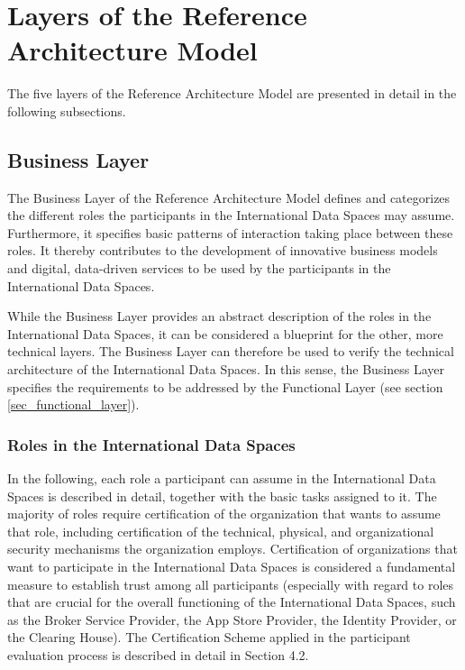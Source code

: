 \section{Layers of the Reference Architecture Model}\label{sec:layers}
The five layers of the Reference Architecture Model are presented in detail in the following subsections.

\subsection{Business Layer}\label{subsec:business_layer}
The Business Layer of the Reference Architecture Model defines and categorizes the different roles the participants in the International Data Spaces may assume. Furthermore, it specifies basic patterns of interaction taking place between these roles. It thereby contributes to the development of innovative business models and digital, data-driven services to be used by the participants in the International Data Spaces. 

While the Business Layer provides an abstract description of the roles in the International Data Spaces, it can be considered a blueprint for the other, more technical layers. The Business Layer can therefore be used to verify the technical architecture of the International Data Spaces. In this sense, the Business Layer specifies the requirements to be addressed by the Functional Layer (see section \ref{sec_functional_layer}). 

\subsubsection{Roles in the International Data Spaces}
In the following, each role a participant can assume in the International Data Spaces is described in detail, together with the basic tasks assigned to it. The majority of roles require certification of the organization that wants to assume that role, including certification of the technical, physical, and organizational security mechanisms the organization employs. Certification of organizations that want to participate in the International Data Spaces is considered a fundamental measure to establish trust among all participants (especially with regard to roles that are crucial for the overall functioning of the International Data Spaces, such as the Broker Service Provider, the App Store Provider, the Identity Provider, or the Clearing House). The Certification Scheme applied in the participant evaluation process is described in detail in Section 4.2.


